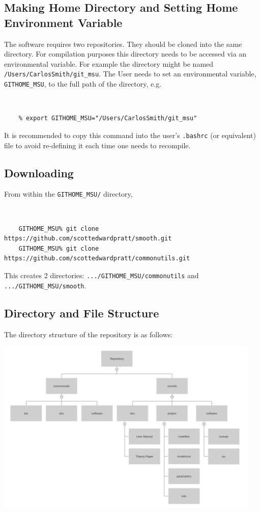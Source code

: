 \documentclass[main.tex]{subfiles}
\begin{document}
\subsection{Making Home Directory and Setting Home Environment Variable}

The software requires two repositories. They should be cloned into the same directory. For compilation purposes this directory needs to be accessed via an environmental variable.  For example the directory might be named {\tt /Users/CarlosSmith/git\_msu}. The User needs to set an environmental variable, {\tt GITHOME\_MSU}, to the full path of the directory, e.g. 
{\tt
\begin{verbatim}
    % export GITHOME_MSU="/Users/CarlosSmith/git_msu"
\end{verbatim}
}
It is recommended to copy this command into the user's {\tt .bashrc} (or equivalent) file to avoid re-defining it each time one needs to recompile.

\subsection{Downloading}\label{sec:Downloading_Compiling}
From within the {\tt GITHOME\_MSU/} directory,\\
\vspace{-20pt}
{\tt 
\begin{verbatim}
    GITHOME_MSU% git clone https://github.com/scottedwardpratt/smooth.git
    GITHOME_MSU% git clone https://github.com/scottedwardpratt/commonutils.git
\end{verbatim}
}

This creates 2 directories: {\tt .../GITHOME\_MSU/commonutils} and {\tt .../GITHOME\_MSU/smooth}.

\subsection{Directory and File Structure}

The directory structure of the repository is as follows: 

\centerline{\includegraphics[width = 0.95\textwidth]{Structure_Tree.png}}
\end{document}
